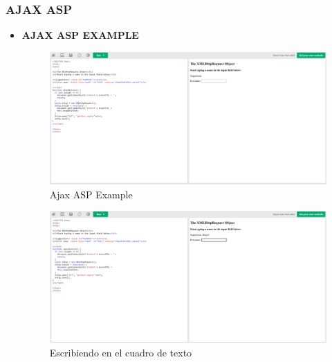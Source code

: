 \documentclass{article}
\begin{document}
	\subsubsection{AJAX ASP}
	\begin{itemize}
		\item \textbf{AJAX ASP EXAMPLE}
		\begin{figure}[H]
			\centering
			\includegraphics[width=1\textwidth,keepaspectratio]{img/ejemplo16.png}
			\caption{Ajax ASP Example}
		\end{figure}
		\begin{figure}[H]
			\centering
			\includegraphics[width=1\textwidth,keepaspectratio]{img/boton16.png}
			\caption{Escribiendo en el cuadro de texto}
		\end{figure}
	\end{itemize}
	\newpage
	
\end{document}
